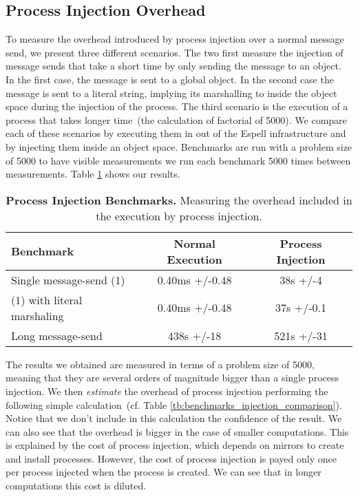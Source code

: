 \subsection{Process Injection Overhead}

To measure the overhead introduced by process injection over a normal message send, we present three different scenarios. The two first measure the injection of message sends that take a short time by only sending the  message to an object. In the first case, the message is sent to a global object. In the second case the message is sent to a literal string, implying its marshalling to inside the object space during the injection of the process. The third scenario is the execution of a process that takes longer time~(the calculation of factorial of 5000). We compare each of these scenarios by executing them in out of the Espell infrastructure and by injecting them inside an object space. Benchmarks are run with a problem size of 5000 to have visible measurements \ie we run each benchmark 5000 times between measurements. Table \ref{tb:benchmarks_injection} shows our results.

\begin{table}[ht]

 	\centering
 	\begin{tabular}{lcc}%
			\toprule
			\textbf{Benchmark}
 			& \textbf{Normal Execution}
			& \textbf{Process Injection}\\
		\midrule
		Single message-send (1) &0.40ms +/-0.48 & 38s +/-4 \\\midrule
		(1) with literal marshaling & 0.40ms +/-0.48 & 37s +/-0.1 \\\midrule
		Long message-send & 438s +/-18 & 521s +/-31\\\midrule
 	\end{tabular}
	\vspace*{0.2cm}
 	\caption{\textbf{Process Injection Benchmarks.} Measuring the overhead included in the execution by process injection.\label{tb:benchmarks_injection}}
 \end{table}

The results we obtained are measured in terms of a problem size of 5000, meaning that they are several orders of magnitude bigger than a single process injection. We then \emph{estimate} the overhead of process injection performing the following simple calculation~(cf. Table \ref{tb:benchmarks_injection_comparison}). Notice that we don't include in this calculation the confidence of the result. We can also see that the overhead is bigger in the case of smaller computations. This is explained by the cost of process injection, which depends on mirrors to create and install processes. However, the cost of process injection is payed only once per process injected when the process is created. We can see that in longer computations this cost is diluted.

